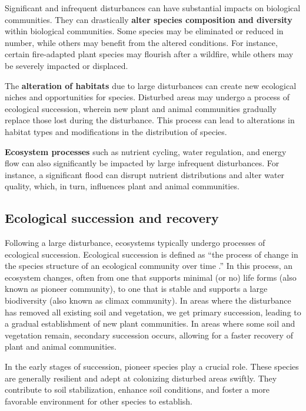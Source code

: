 \documentclass[
  12 pt,
]{Nemilov}
\begin{document}
Significant and infrequent disturbances can have substantial impacts on biological communities. They can drastically \textbf{alter species composition and diversity} within biological communities. Some species may be eliminated or reduced in number, while others may benefit from the altered conditions. For instance, certain fire-adapted plant species may flourish after a wildfire, while others may be severely impacted or displaced.

The \textbf{alteration of habitats} due to large disturbances can create new ecological niches and opportunities for species. Disturbed areas may undergo a process of ecological succession, wherein new plant and animal communities gradually replace those lost during the disturbance. This process can lead to alterations in habitat types and modifications in the distribution of species.

\textbf{Ecosystem processes} such as nutrient cycling, water regulation, and energy flow can also significantly be impacted by large infrequent disturbances. For instance, a significant flood can disrupt nutrient distributions and alter water quality, which, in turn, influences plant and animal communities.

\subsection{Ecological succession and recovery}\label{ecological-succession-and-recovery}

Following a large disturbance, ecosystems typically undergo processes of ecological succession. Ecological succession is defined as ``the process of change in the species structure of an ecological community over time \citep{awadhiya2021principles}.'' In this process, an ecosystem changes, often from one that supports minimal (or no) life forms (also known as pioneer community), to one that is stable and supports a large biodiversity (also known as climax community). In areas where the disturbance has removed all existing soil and vegetation, we get primary succession, leading to a gradual establishment of new plant communities. In areas where some soil and vegetation remain, secondary succession occurs, allowing for a faster recovery of plant and animal communities.

In the early stages of succession, pioneer species play a crucial role. These species are generally resilient and adept at colonizing disturbed areas swiftly. They contribute to soil stabilization, enhance soil conditions, and foster a more favorable environment for other species to establish.
\end{document}
